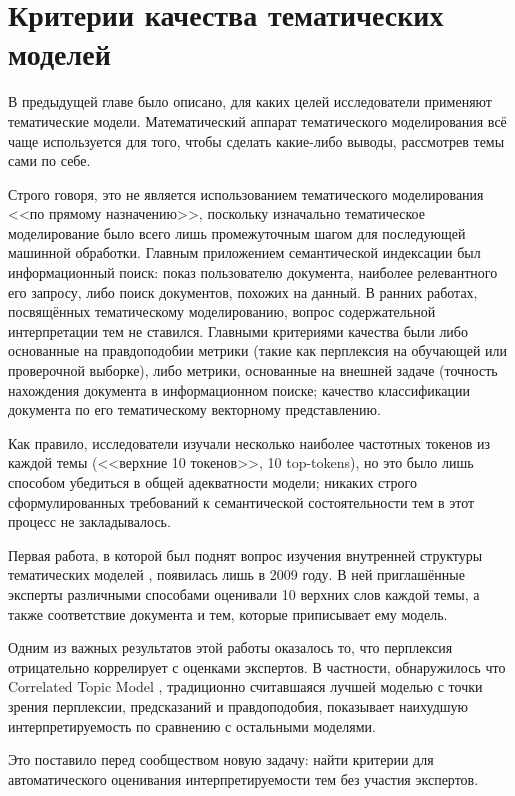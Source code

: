 \chapter{Критерии качества тематических моделей}
\label{chap:metrics}


В предыдущей главе было описано, для каких целей исследователи применяют тематические модели. Математический аппарат тематического моделирования всё чаще используется для того, чтобы сделать какие-либо выводы, рассмотрев темы сами по себе.

Строго говоря, это не является использованием тематического моделирования <<по прямому назначению>>, поскольку изначально тематическое моделирование было всего лишь промежуточным шагом для последующей машинной обработки. Главным приложением семантической индексации был информационный поиск: показ пользователю документа, наиболее релевантного его запросу, либо поиск документов, похожих на данный.
В ранних работах, посвящённых тематическому моделированию, вопрос содержательной интерпретации тем не ставился. Главными критериями качества были либо основанные на правдоподобии метрики (такие как перплексия на обучающей или проверочной выборке), либо метрики, основанные на внешней задаче (точность нахождения документа в информационном поиске; качество классификации документа по его тематическому векторному представлению.

Как правило, исследователи изучали несколько наиболее частотных токенов из каждой темы (<<верхние 10 токенов>>, 10 top-tokens), но это было лишь способом убедиться в общей адекватности модели; никаких строго сформулированных требований к семантической состоятельности тем в этот процесс не закладывалось.

Первая работа, в которой был поднят вопрос изучения внутренней структуры тематических моделей \cite{rtl}, появилась лишь в 2009 году. В ней приглашённые эксперты различными способами оценивали 10 верхних слов каждой темы, а также соответствие документа и тем, которые приписывает ему модель.

Одним из важных результатов этой работы оказалось то, что перплексия отрицательно коррелирует с оценками экспертов. В частности, обнаружилось что Correlated Topic Model \cite{blei2007correlated}, традиционно считавшаяся лучшей моделью с точки зрения перплексии, предсказаний и правдоподобия, показывает наихудшую интерпретируемость по сравнению с остальными моделями.

Это поставило перед сообществом новую задачу: найти критерии для автоматического оценивания интерпретируемости тем без участия экспертов.

